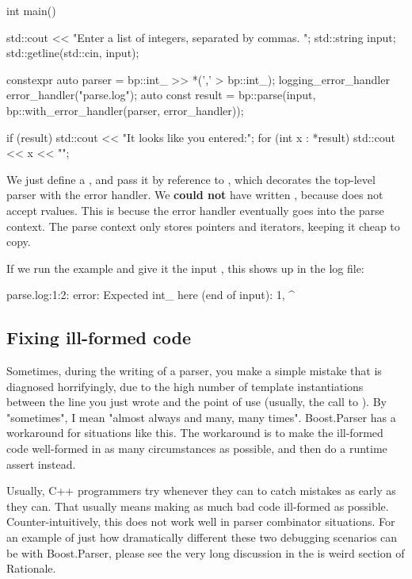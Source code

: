 \documentclass{MyBook}
\begin{document}
\begin{code}
int main()
{
    std::cout << "Enter a list of integers, separated by commas. ";
    std::string input;
    std::getline(std::cin, input);

    constexpr auto parser = bp::int_ >> *(',' > bp::int_);
    logging_error_handler error_handler("parse.log");
    auto const result = bp::parse(input, bp::with_error_handler(parser, error_handler));

    if (result) {
        std::cout << "It looks like you entered:\n";
        for (int x : *result) {
            std::cout << x << "\n";
        }
    }
}
\end{code}

We just define a , and pass it by reference to , which decorates the top-level parser with the error handler. We \textbf{could not} have written , because  does not accept rvalues. This is becuse the error handler eventually goes into the parse context. The parse context only stores pointers and iterators, keeping it cheap to copy.

If we run the example and give it the input , this shows up in the log file:

\begin{code}
parse.log:1:2: error: Expected int_ here (end of input):
1,
  ^
\end{code}

\subsection{Fixing ill-formed code}

Sometimes, during the writing of a parser, you make a simple mistake that is diagnosed horrifyingly, due to the high number of template instantiations between the line you just wrote and the point of use (usually, the call to ). By "sometimes", I mean "almost always and many, many times". Boost.Parser has a workaround for situations like this. The workaround is to make the ill-formed code well-formed in as many circumstances as possible, and then do a runtime assert instead.

Usually, C++ programmers try whenever they can to catch mistakes as early as they can. That usually means making as much bad code ill-formed as possible. Counter-intuitively, this does not work well in parser combinator situations. For an example of just how dramatically different these two debugging scenarios can be with Boost.Parser, please see the very long discussion in the  is weird section of Rationale.
\end{document}
